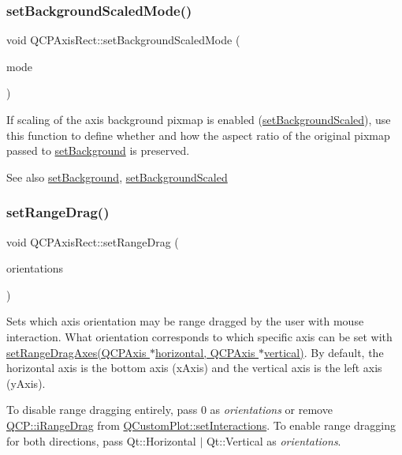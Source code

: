 \subsubsection{\texorpdfstring{set\+Background\+Scaled\+Mode()}{setBackgroundScaledMode()}}
{\footnotesize\ttfamily void Q\+C\+P\+Axis\+Rect\+::set\+Background\+Scaled\+Mode (\begin{DoxyParamCaption}\item[{Qt\+::\+Aspect\+Ratio\+Mode}]{mode }\end{DoxyParamCaption})}

If scaling of the axis background pixmap is enabled (\hyperlink{classQCPAxisRect_ae6d36c3e0e968ffb991170a018e7b503}{set\+Background\+Scaled}), use this function to define whether and how the aspect ratio of the original pixmap passed to \hyperlink{classQCPAxisRect_af615ab5e52b8e0a9a0eff415b6559db5}{set\+Background} is preserved. \begin{DoxySeeAlso}{See also}
\hyperlink{classQCPAxisRect_af615ab5e52b8e0a9a0eff415b6559db5}{set\+Background}, \hyperlink{classQCPAxisRect_ae6d36c3e0e968ffb991170a018e7b503}{set\+Background\+Scaled} 
\end{DoxySeeAlso}
\mbox{\label{classQCPAxisRect_ae6aef2f7211ba6097c925dcd26008418}} 
\subsubsection{\texorpdfstring{set\+Range\+Drag()}{setRangeDrag()}}
{\footnotesize\ttfamily void Q\+C\+P\+Axis\+Rect\+::set\+Range\+Drag (\begin{DoxyParamCaption}\item[{Qt\+::\+Orientations}]{orientations }\end{DoxyParamCaption})}

Sets which axis orientation may be range dragged by the user with mouse interaction. What orientation corresponds to which specific axis can be set with \hyperlink{classQCPAxisRect_a648cce336bd99daac4a5ca3e5743775d}{set\+Range\+Drag\+Axes(\+Q\+C\+P\+Axis $\ast$horizontal, Q\+C\+P\+Axis $\ast$vertical)}. By default, the horizontal axis is the bottom axis (x\+Axis) and the vertical axis is the left axis (y\+Axis).

To disable range dragging entirely, pass 0 as {\itshape orientations} or remove \hyperlink{namespaceQCP_a2ad6bb6281c7c2d593d4277b44c2b037a2c4432b9aceafb94000be8d1b589ef18}{Q\+C\+P\+::i\+Range\+Drag} from \hyperlink{classQCustomPlot_a5ee1e2f6ae27419deca53e75907c27e5}{Q\+Custom\+Plot\+::set\+Interactions}. To enable range dragging for both directions, pass {\ttfamily Qt\+::\+Horizontal $\vert$ Qt\+::\+Vertical} as {\itshape orientations}.

